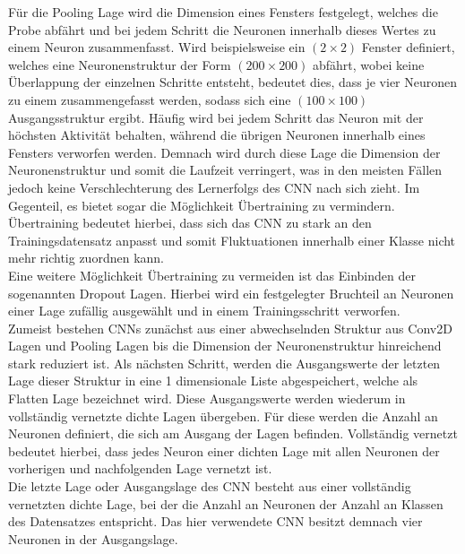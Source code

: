 Für die Pooling Lage wird die Dimension eines Fensters festgelegt, welches die Probe abfährt und bei jedem Schritt die Neuronen innerhalb dieses Wertes zu einem Neuron zusammenfasst. Wird beispielsweise ein $(2\times 2)$ Fenster definiert, welches eine Neuronenstruktur der Form $(200 \times 200)$ abfährt, wobei keine Überlappung der einzelnen Schritte entsteht, bedeutet dies, dass je vier Neuronen zu einem zusammengefasst werden, sodass sich eine $(100\times 100)$ Ausgangsstruktur ergibt. Häufig wird bei jedem Schritt das Neuron mit der höchsten Aktivität behalten, während die übrigen Neuronen innerhalb eines Fensters verworfen werden. Demnach wird durch diese Lage die Dimension der Neuronenstruktur und somit die Laufzeit verringert, was in den meisten Fällen jedoch keine Verschlechterung des Lernerfolgs des CNN nach sich zieht. Im Gegenteil, es bietet sogar die Möglichkeit Übertraining zu vermindern. Übertraining bedeutet hierbei, dass sich das CNN zu stark an den Trainingsdatensatz anpasst und somit Fluktuationen innerhalb einer Klasse nicht mehr richtig zuordnen kann. \\
Eine weitere Möglichkeit Übertraining zu vermeiden ist das Einbinden der sogenannten Dropout Lagen. Hierbei wird ein festgelegter Bruchteil an Neuronen einer Lage zufällig ausgewählt und in einem Trainingsschritt verworfen. \\
Zumeist bestehen CNNs zunächst aus einer abwechselnden Struktur aus Conv2D Lagen und Pooling Lagen bis die Dimension der Neuronenstruktur hinreichend stark reduziert ist. Als nächsten Schritt, werden die Ausgangswerte der letzten Lage dieser Struktur in eine 1 dimensionale Liste abgespeichert, welche als Flatten Lage bezeichnet wird. Diese Ausgangswerte werden wiederum in vollständig vernetzte dichte Lagen übergeben. Für diese werden die Anzahl an Neuronen definiert, die sich am Ausgang der Lagen befinden. Vollständig vernetzt bedeutet hierbei, dass jedes Neuron einer dichten Lage mit allen Neuronen der vorherigen und nachfolgenden Lage vernetzt ist.  \\
Die letzte Lage oder Ausgangslage des CNN besteht aus einer vollständig vernetzten dichte Lage, bei der die Anzahl an Neuronen der Anzahl an Klassen des Datensatzes entspricht. Das hier verwendete CNN besitzt demnach vier Neuronen in der Ausgangslage. \\
\captionsetup[table]{name=Abbildung}
